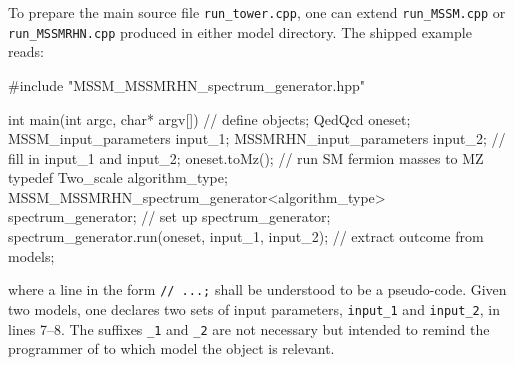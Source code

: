 \documentclass[final,3p,11pt,pdflatex]{elsarticle}
\newcommand{\code}[1]{\lstinline|#1|}  %
\begin{document}
To prepare the main source file \code{run_tower.cpp},
one can extend %
\code{run_MSSM.cpp} or \code{run_MSSMRHN.cpp}
produced in either model directory.
The shipped example reads:
\begin{numlstlisting}
#include "MSSM_MSSMRHN_spectrum_generator.hpp"

int main(int argc, char* argv[])
{
  // define objects;
  QedQcd oneset;
  MSSM_input_parameters    input_1;
  MSSMRHN_input_parameters input_2;
  // fill in input_1 and input_2;
  oneset.toMz(); // run SM fermion masses to MZ
  typedef Two_scale algorithm_type;
  MSSM_MSSMRHN_spectrum_generator<algorithm_type> spectrum_generator;
  // set up spectrum_generator;
  spectrum_generator.run(oneset, input_1, input_2);
  // extract outcome from models;
}
\end{numlstlisting}
where a line in the form \code{// ...;} shall be understood
to be a pseudo-code.
Given two models,
one declares two sets of input parameters,
\code{input_1} and \code{input_2}, in lines 7--8.
The suffixes \code{_1} and \code{_2} are not necessary but intended to remind
the programmer of to which model the object is relevant.
\end{document}
